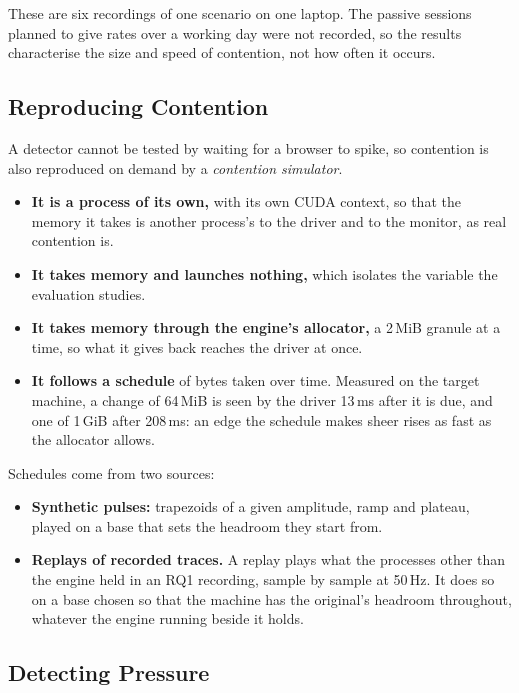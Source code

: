 \documentclass[11pt]{article}
\begin{document}
These are six recordings of one scenario on one laptop. The passive sessions
planned to give rates over a working day were not recorded, so the results
characterise the size and speed of contention, not how often it occurs.

\subsection{Reproducing Contention}
\label{sec:simulator}

A detector cannot be tested by waiting for a browser to spike, so contention is
also reproduced on demand by a \textit{contention simulator}.
\begin{itemize}
\item \textbf{It is a process of its own,} with its own CUDA context, so that
the memory it takes is another process's to the driver and to the monitor, as
real contention is.
\item \textbf{It takes memory and launches nothing,} which isolates the variable
the evaluation studies.
\item \textbf{It takes memory through the engine's allocator,} a 2\,MiB granule
at a time, so what it gives back reaches the driver at once.
\item \textbf{It follows a schedule} of bytes taken over time. Measured on the
target machine, a change of 64\,MiB is seen by the driver 13\,ms after it is
due, and one of 1\,GiB after 208\,ms: an edge the schedule makes sheer rises as
fast as the allocator allows.
\end{itemize}

Schedules come from two sources:
\begin{itemize}
\item \textbf{Synthetic pulses:} trapezoids of a given amplitude, ramp and
plateau, played on a base that sets the headroom they start from.
\item \textbf{Replays of recorded traces.} A replay plays what the processes
other than the engine held in an RQ1 recording, sample by sample at 50\,Hz. It
does so on a base chosen so that the machine has the original's headroom
throughout, whatever the engine running beside it holds.
\end{itemize}

\subsection{Detecting Pressure}
\label{sec:detection}
\end{document}
